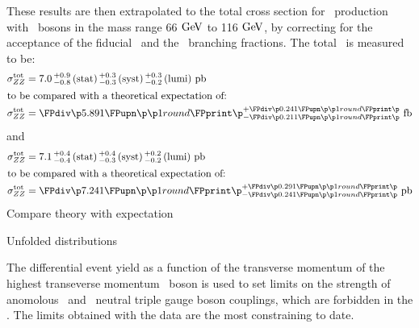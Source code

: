 These results are then extrapolated to the total cross section for \ZZ\
production with \Z\ bosons in the mass range 66$\GeV$ to 116$\GeV$, by
correcting for the acceptance of the fiducial \phasespace\ and the \Zll\
branching fractions. The total \cx\ is measured to be:
\begin{align}
\sigmaTotZZ &= \ZZSevenTeVTotalCrossSection \\
\intertext{to be compared with a theoretical expectation of:}
\sigmaTotZZ &= \ZZSevenTeVTheoryTotalCrossSection
\end{align}
and
\begin{align}
\sigmaTotZZ &= \ZZEightTeVTotalCrossSection \\
\intertext{to be compared with a theoretical expectation of:}
\sigmaTotZZ &= \ZZEightTeVTheoryTotalCrossSection
\end{align}
Compare theory with expectation

Unfolded distributions

The differential event yield as a function of the transverse momentum of the
highest transeverse momentum \Z\ boson is used to set limits on the strength of
anomolous \ZZZ\ and \ZZg\ neutral triple gauge boson couplings, which are
forbidden in the \sm. 
The limits obtained with the \sqrtseq{8} data are the most constraining to date.
